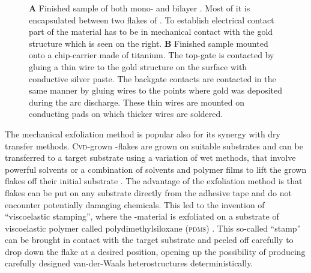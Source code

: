 \begin{figure}[t]
\begin{subfigure}{0.4\textwidth}
\end{subfigure}
\begin{subfigure}{0.4\textwidth}
	\caption{}
\end{subfigure}
\caption{\textbf{A} Finished sample of both mono- and bilayer \wse\!. Most of it is encapsulated between two flakes of \hbn. To establish electrical contact part of the \tmdg material has to be in mechanical contact with the gold structure which is seen on the right. \textbf{B} Finished sample mounted onto a chip-carrier made of titanium. The top-gate is contacted by gluing a thin wire to the gold structure on the surface with conductive silver paste. The backgate contacts are contacted in the same manner by gluing wires to the points where gold was deposited during the arc discharge. These thin wires are mounted on conducting pads on which thicker wires are soldered.}
	\label{finishedsample}
\end{figure}

The mechanical exfoliation method is popular also for its synergy with dry transfer methods. \textsc{Cvd}-grown \tmd-flakes are grown on suitable substrates and can be transferred to a target substrate using a variation of wet methods, that involve powerful solvents or a combination of solvents and polymer films to lift the grown flakes off their initial substrate  \cite{li_universal_2014}. The advantage of the exfoliation method is that flakes can be put on any substrate directly from the adhesive tape and do not encounter potentially damaging chemicals. This led to the invention of ``viscoelastic stamping'', where the \tmd-material is exfoliated on a substrate of viscoelastic polymer called polydimethylsiloxane (\textsc{pdms}) \cite{castellanos-gomez_deterministic_2014}. This so-called ``stamp'' can be brought in contact with the target substrate and peeled off carefully to drop down the flake at a desired position, opening up the possibility of producing carefully designed van-der-Waals heterostructures deterministically.

